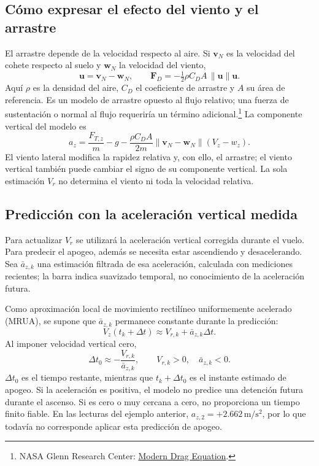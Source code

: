 \documentclass[11pt,a4paper]{article}
\begin{document}
\subsection{Cómo expresar el efecto del viento y el arrastre}
El arrastre depende de la velocidad respecto al aire. Si $\mathbf v_N$ es la velocidad del cohete respecto al suelo y $\mathbf w_N$ la velocidad del viento,
\begin{equation}
 \mathbf u=\mathbf v_N-\mathbf w_N,\qquad
 \mathbf F_D=-\tfrac12\rho C_D A\,\|\mathbf u\|\mathbf u.
\end{equation}
Aquí $\rho$ es la densidad del aire, $C_D$ el coeficiente de arrastre y $A$ su área de referencia. Es un modelo de arrastre opuesto al flujo relativo; una fuerza de sustentación o normal al flujo requeriría un término adicional.\footnote{NASA Glenn Research Center: \href{https://www1.grc.nasa.gov/beginners-guide-to-aeronautics/modern-drag-equation/}{Modern Drag Equation}.}
La componente vertical del modelo es
\begin{equation}
 a_z=\frac{F_{T,z}}{m}-g-
 \frac{\rho C_D A}{2m}\|\mathbf v_N-\mathbf w_N\|(V_z-w_z).
\end{equation}
El viento lateral modifica la rapidez relativa y, con ello, el arrastre; el viento vertical también puede cambiar el signo de su componente vertical. La sola estimación $V_r$ no determina el viento ni toda la velocidad relativa.

\newpage
\subsection{Predicción con la aceleración vertical medida}
Para actualizar $V_r$ se utilizará la aceleración vertical corregida durante el vuelo. Para predecir el apogeo, además se necesita estar ascendiendo y desacelerando. Sea $\bar a_{z,k}$ una estimación filtrada de esa aceleración, calculada con mediciones recientes; la barra indica suavizado temporal, no conocimiento de la aceleración futura.

Como aproximación local de movimiento rectilíneo uniformemente acelerado (MRUA), se supone que $\bar a_{z,k}$ permanece constante durante la predicción:
\begin{equation}
 V_z(t_k+\Delta t)\approx V_{r,k}+\bar a_{z,k}\Delta t.
\end{equation}
Al imponer velocidad vertical cero,
\begin{equation}
 \boxed{\Delta t_0\approx-\frac{V_{r,k}}{\bar a_{z,k}}},
 \qquad V_{r,k}>0,\quad \bar a_{z,k}<0.
\end{equation}
$\Delta t_0$ es el tiempo restante, mientras que $t_k+\Delta t_0$ es el instante estimado de apogeo. Si la aceleración es positiva, el modelo no predice una detención futura durante el ascenso. Si es cero o muy cercana a cero, no proporciona un tiempo finito fiable. En las lecturas del ejemplo anterior, $a_{z,2}=+2.662\,\mathrm{m/s^2}$, por lo que todavía no corresponde aplicar esta predicción de apogeo.
\end{document}
